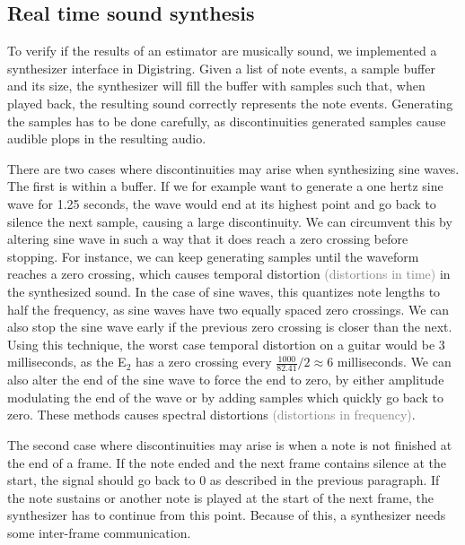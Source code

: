 \documentclass[a4paper,10pt,twocolumn]{article}
\newcommand{\note}[2]{#1${}_{#2}$}
\begin{document}
\subsection{Real time sound synthesis}
To verify if the results of an estimator are musically sound, we implemented a synthesizer interface in Digistring. Given a list of note events, a sample buffer and its size, the synthesizer will fill the buffer with samples such that, when played back, the resulting sound correctly represents the note events. Generating the samples has to be done carefully, as discontinuities generated samples cause audible plops in the resulting audio.%

There are two cases where discontinuities may arise when synthesizing sine waves. The first is within a buffer. If we for example want to generate a one hertz sine wave for 1.25 seconds, the wave would end at its highest point and go back to silence the next sample, causing a large discontinuity. We can circumvent this by altering sine wave in such a way that it does reach a zero crossing before stopping. For instance, we can keep generating samples until the waveform reaches a zero crossing, which causes temporal distortion \textcolor{gray}{(distortions in time)} in the synthesized sound. In the case of sine waves, this quantizes note lengths to half the frequency, as sine waves have two equally spaced zero crossings. We can also stop the sine wave early if the previous zero crossing is closer than the next. Using this technique, the worst case temporal distortion on a guitar would be 3 milliseconds, as the \note{E}{2} has a zero crossing every $ \frac{1000}{82.41} / 2 \approx 6 $ milliseconds. We can also alter the end of the sine wave to force the end to zero, by either amplitude modulating the end of the wave or by adding samples which quickly go back to zero. These methods causes spectral distortions \textcolor{gray}{(distortions in frequency)}.

The second case where discontinuities may arise is when a note is not finished at the end of a frame. If the note ended and the next frame contains silence at the start, the signal should go back to 0 as described in the previous paragraph. If the note sustains or another note is played at the start of the next frame, the synthesizer has to continue from this point. Because of this, a synthesizer needs some inter-frame communication.
\end{document}
